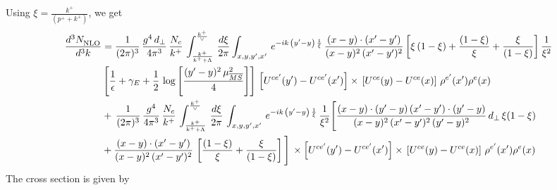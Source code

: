 \documentclass[9pt]{article}
\numberwithin{equation}{section}
\begin{document}
Using $\xi = \frac{k^{+}}{(p^{+}+k^{+})}$, we get
\begin{align}
     \frac{d^{3}N_{\rm NLO}^{\rm}}{d^{3}k}  & =  \frac{1}{(2\pi)^{3}}\,\frac{g^{4}\,d_{\perp}}{4\pi^{3}}\,\frac{N_{c}}{k^{+}}\,\int_{\frac{k^{+}}{k^{+}+\Lambda}}^{\frac{k^{+}}{\vee}}\, \frac{d\xi}{2\pi}\int_{x,y,y^{\prime},x'}\,e^{-ik\,\left(y'-y\right)\,\frac{1}{\xi}}\,\frac{(x-y)\cdot (x'-y')}{(x-y)^{2}\,(x'-y')^{2}}\,\bigg[\xi\,(1-\xi)+\frac{(1-\xi)}{\xi}+\frac{\xi}{(1-\xi)}\bigg]\,\frac{1}{\xi^{2}}\notag \\ & \left[\frac{1}{\epsilon} +\gamma_{E} +\frac{1}{2}\,\log{\left[\frac{(y'-y)^{2}\,\mu^{2}_{\overline{MS}}}{4}\right]}\right]\,\left[U^{ce'}(y') - U^{ce'}(x')\right] \times\, \left[U^{ce}(y) - U^{ce}(x)\right]\, \rho^{e'}(x') \rho^{e}(x)\notag \\ & +\,\frac{1}{(2\pi)^{3}}\,\frac{g^{4}}{4\pi^{3}}\,\frac{N_{c}}{k^{+}}\,\int_{\frac{k^{+}}{k^{+}+\Lambda}}^{\frac{k^{+}}{\vee}}\, \frac{d\xi}{2\pi}\,\int_{x,y,y^{\prime},x'}\,e^{-ik\,\left(y'-y\right)\,\frac{1}{\xi}}\,\frac{1}{\xi^{2}}\Bigg[\frac{(x-y)\cdot (y'-y)\, (x'-y')\cdot (y'-y)}{(x-y)^{2}\,(x'-y')^{2}\,(y'-y)^{2}}\,d_{\perp}\,\xi(1-\xi)\notag \\ & + \frac{(x-y)\cdot (x'-y')}{(x-y)^{2}\,(x'-y')^{2}}\,\left[\frac{(1-\xi)}{\xi}+\frac{\xi}{(1-\xi)}\right]\Bigg]\,\times \left[U^{ce'}(y') - U^{ce'}(x')\right] \times\, \left[U^{ce}(y) - U^{ce}(x)\right]\, \rho^{e'}(x') \rho^{e}(x)
\end{align}
The cross section is given by
\end{document}
